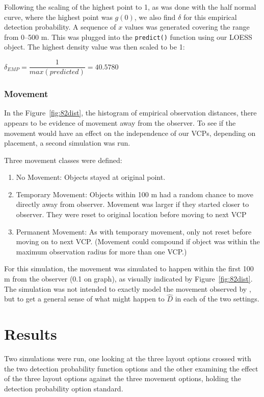\documentclass[12pt]{article}
\begin{document}
Following the scaling of the highest point to 1, as was done with the half normal curve, where the highest point was $g(0)$, we also find $\delta$ for this empirical detection probability. A sequence of $x$ values was generated covering the range from 0--500 m. This was plugged into the \texttt{predict()} function using our LOESS object. The highest density value was then scaled to be 1:

$\delta_{EMP}=\dfrac{1}{max(predicted)}=40.5780$ 

\subsubsection{Movement}
In the Figure~\ref{fig:82dist}, the histogram of empirical observation distances, there appears to be evidence of movement away from the observer. To see if the movement would have an effect on the independence of our VCPs, depending on placement, a second simulation was run.

Three movement classes were defined:
\begin{enumerate}
\item No Movement: Objects stayed at original point.
\item Temporary Movement: Objects within 100 m had a random chance to move directly away from observer. Movement was larger if they started closer to observer. They were reset to original location before moving to next VCP
\item Permanent Movement: As with temporary movement, only not reset before moving on to next VCP. (Movement could compound if object was within the maximum observation radius for more than one VCP.)
\end{enumerate}

For this simulation, the movement was simulated to happen within the first 100 m from the observer (0.1 on graph), as visually indicated by Figure~\ref{fig:82dist}. The simulation was not intended to exactly model the movement observed by \textcite{micronesian}, but to get a general sense of what might happen to $\hat{D}$ in each of the two settings.

\section{Results}
Two simulations were run, one looking at the three layout options crossed with the two detection probability function options and the other examining the effect of the three layout options against the three movement options, holding the detection probability option standard.
\end{document}
